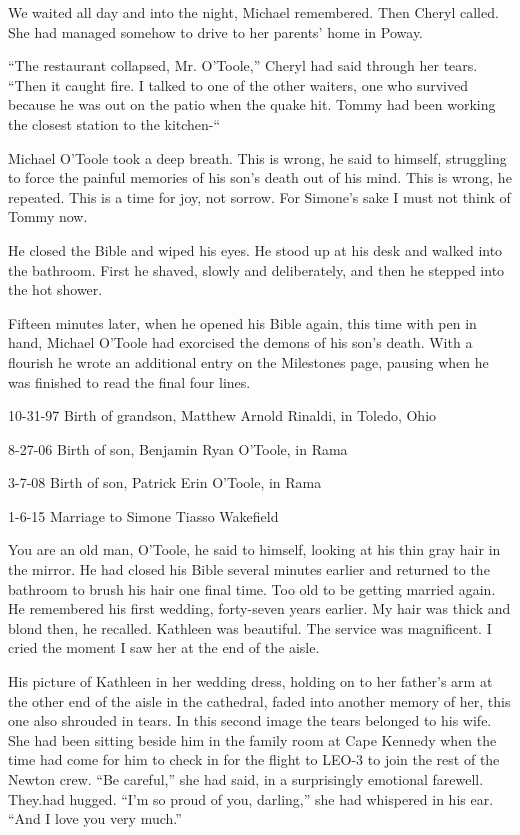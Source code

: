 \documentclass[]{article}
\begin{document}
{We waited all day and into the night, Michael remembered.  Then Cheryl called.  She had managed somehow to drive to her parents’ home in Poway.

“The restaurant collapsed, Mr.  O’Toole,” Cheryl had said through her tears.  “Then it caught fire.  I talked to one of the other waiters, one who survived because he was out on the patio when the quake hit.  Tommy had been working the closest station to the kitchen-“

Michael O’Toole took a deep breath.  This is wrong, he said to himself, struggling to force the painful memories of his son’s death out of his mind.  This is wrong, he repeated.  This is a time for joy, not sorrow.  For Simone’s sake I must not think of Tommy now.

He closed the Bible and wiped his eyes.  He stood up at his desk and walked into the bathroom.  First he shaved, slowly and deliberately, and then he stepped into the hot shower.

Fifteen minutes later, when he opened his Bible again, this time with pen in hand, Michael O’Toole had exorcised the demons of his son’s death.  With a flourish he wrote an additional entry on the Milestones page, pausing when he was finished to read the final four lines.

10-31-97 Birth of grandson, Matthew Arnold Rinaldi, in Toledo, Ohio

8-27-06 Birth of son, Benjamin Ryan O’Toole, in Rama

3-7-08 Birth of son, Patrick Erin O’Toole, in Rama

1-6-15 Marriage to Simone Tiasso Wakefield

You are an old man, O’Toole, he said to himself, looking at his thin gray hair in the mirror.  He had closed his Bible several minutes earlier and returned to the bathroom to brush his hair one final time.  Too old to be getting married again.  He remembered his first wedding, forty-seven years earlier.  My hair was thick and blond then, he recalled.  Kathleen was beautiful.  The service was magnificent.  I cried the moment I saw her at the end of the aisle.

His picture of Kathleen in her wedding dress, holding on to her father’s arm at the other end of the aisle in the cathedral, faded into another memory of her, this one also shrouded in tears.  In this second image the tears belonged to his wife.  She had been sitting beside him in the family room at Cape Kennedy when the time had come for him to check in for the flight to LEO-3 to join the rest of the Newton crew.  “Be careful,” she had said, in a surprisingly emotional farewell.  They.had hugged.  “I’m so proud of you, darling,” she had whispered in his ear.  “And I love you very much.”

}
\end{document}
